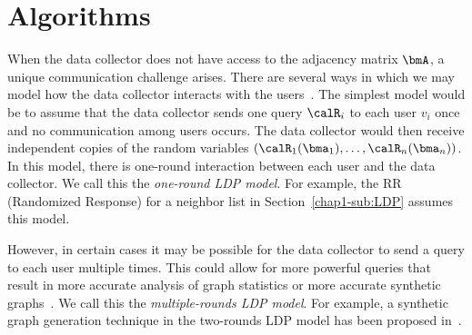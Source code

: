 \section{Algorithms}
\label{chap1-sec:algorithms}
When the data collector does not have access to the adjacency matrix
$\bmA$, a unique communication challenge arises. There are several ways in
which we may model how the data collector interacts with the users~\cite{Duchi_FOCS13,Joseph_SODA20,qin2017generating}.
The simplest model would be to assume that 
the data collector sends 
one query $\calR_i$ to each user $v_i$ once 
and no communication among users occurs.
The data collector would then receive independent copies of the random variables
$(\calR_1(\bma_1), \ldots, \calR_n(\bma_n))$. 
In this model, there is one-round interaction between each user and the data collector. 
We call this the
\textit{one-round LDP model}. 
For example, the RR (Randomized Response) for a neighbor list in Section~\ref{chap1-sub:LDP} assumes this model.

However, in certain cases it may be possible 
for the data collector to send a query to each user multiple times. 
This could allow for more powerful queries that result in more accurate analysis
of graph statistics or more accurate synthetic graphs~\cite{qin2017generating}. 
We call this the \textit{multiple-rounds LDP model}. 
For example, a synthetic graph generation technique in the two-rounds LDP model has been proposed in~\cite{qin2017generating}.


% 

